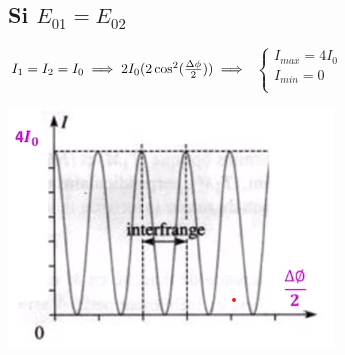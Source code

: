 \documentclass[12pt]{book}
\begin{document}
            \subsection*{Si $E_{01} = E_{02}$}
                \begin{center}
                    \begin{minipage}{0.49\linewidth}
                        $ I_1=I_2=I_0 \implies 2I_0(2\cos^2(\frac{\Delta\phi}{2})) \\ \implies$ 
                        $\begin{cases}
                            I_{max}=4I_0\\
                            I_{min}=0\\
                        \end{cases}$
                    \end{minipage}
                    \begin{minipage}{0.49\linewidth}
                        \includegraphics[width=\linewidth]{pic/interference.png}                      
                    \end{minipage}
                \end{center}
\end{document}
